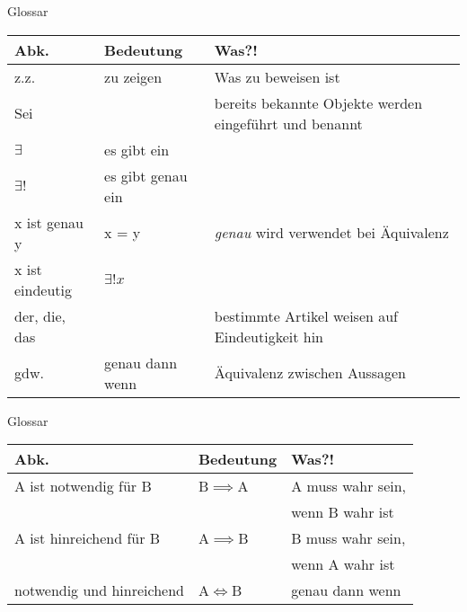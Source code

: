 %
%
%
%

\begin{frame}[fragile]{Glossar}
	\small
	\begin{tabular}{p{} p{} p{}}
		\toprule
		Abk.&Bedeutung&Was?!\\
		\midrule
		z.z. & zu zeigen & Was zu beweisen ist\\
		Sei&&bereits bekannte Objekte werden eingeführt und benannt\\
		$\exists$&es gibt ein&\\
		$\exists !$&es gibt genau ein&\\
		x ist genau y&x = y&\emph{genau} wird verwendet bei Äquivalenz\\
		x ist eindeutig&$\exists ! x$&\\
		der, die, das&&bestimmte Artikel weisen auf Eindeutigkeit hin\\
		gdw.&genau dann wenn&Äquivalenz zwischen Aussagen\\
		\bottomrule
	\end{tabular}
\end{frame}
\begin{frame}[fragile]{Glossar}
	\small
	\begin{tabular}{p{} p{} p{}}
		\toprule
		Abk.&Bedeutung&Was?!\\
		\midrule
		A ist notwendig für B&B$\implies$A&A muss wahr sein,\\
		&&wenn B wahr ist\\
		A ist hinreichend für B&A$\implies$B&B muss wahr sein,\\
		&&wenn A wahr ist\\
		notwendig und hinreichend&A$\iff$B&genau dann wenn\\
		\bottomrule
	\end{tabular}
\end{frame}

